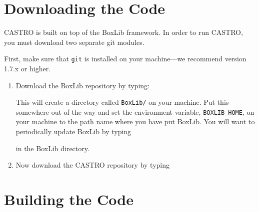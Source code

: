 
\section{Downloading the Code}

CASTRO is built on top of the BoxLib framework.  In order to run CASTRO, you must download
two separate git modules.

\vspace{.1in}

\noindent First, make sure that {\tt git} is installed on your machine---we recommend version 1.7.x or higher.

\vspace{.1in}

\begin{enumerate}

\item Download the BoxLib repository by typing: 


\noindent This will create a directory called {\tt BoxLib/} on your
machine.  Put this somewhere out of the way and set the environment
variable, {\tt BOXLIB\_HOME}, on your machine to the path name where
you have put BoxLib.  You will want to periodically update BoxLib by
typing


in the BoxLib directory.  

\item Now download the CASTRO repository by typing 


\end{enumerate}


\section{Building the Code}

